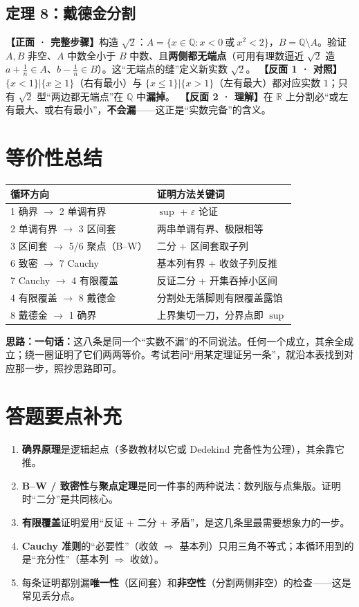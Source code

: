 \documentclass[11pt,a4paper,UTF8]{ctexart}
\newcommand{\R}{\mathbb R}
\newcommand{\eps}{\varepsilon}
\newcommand{\Q}{\mathbb Q}
\newcommand{\idea}[1]{\par\smallskip\noindent\colorbox{yellow!20}{\parbox{\dimexpr\linewidth-2\fboxsep}{\textbf{思路：}#1}}\par\smallskip}
\begin{document}
\subsection{定理 8：戴德金分割}

\noindent\textbf{【正面 · 完整步骤】}构造 $\sqrt2$：$A=\{x\in\Q:x<0\ \text{或}\ x^2<2\}$，$B=\Q\setminus A$。验证 $A,B$ 非空、$A$ 中数全小于 $B$ 中数、且\textbf{两侧都无端点}（可用有理数逼近 $\sqrt2$ 造 $a+\tfrac1n\in A$、$b-\tfrac1n\in B$）。这“无端点的缝”定义新实数 $\sqrt2$。
\textbf{【反面 1 · 对照】}$\{x<1\}|\{x\ge1\}$（右有最小）与 $\{x\le1\}|\{x>1\}$（左有最大）都对应实数 $1$；只有 $\sqrt2$ 型“两边都无端点”在 $\Q$ 中\textbf{漏掉}。\ \textbf{【反面 2 · 理解】}在 $\R$ 上分割必“或左有最大、或右有最小”，\textbf{不会漏}——这正是“实数完备”的含义。

\section{等价性总结}

\begin{center}
\begin{tabular}{ll}
循环方向 & 证明方法关键词\\\hline
1 确界 $\to$ 2 单调有界 & $\sup$ + $\eps$ 论证\\
2 单调有界 $\to$ 3 区间套 & 两串单调有界、极限相等\\
3 区间套 $\to$ 5/6 聚点（B–W） & 二分 + 区间套取子列\\
6 致密 $\to$ 7 Cauchy & 基本列有界 + 收敛子列反推\\
7 Cauchy $\to$ 4 有限覆盖 & 反证二分 + 开集吞掉小区间\\
4 有限覆盖 $\to$ 8 戴德金 & 分割处无落脚则有限覆盖露馅\\
8 戴德金 $\to$ 1 确界 & 上界集切一刀，分界点即 $\sup$\\
\end{tabular}
\end{center}

\idea{\textbf{一句话：}这八条是同一个“实数不漏”的不同说法。任何一个成立，其余全成立；绕一圈证明了它们两两等价。考试若问“用某定理证另一条”，就沿本表找到对应那一步，照抄思路即可。}

\section{答题要点补充}
\begin{enumerate}[leftmargin=1.4em]
\item \textbf{确界原理}是逻辑起点（多数教材以它或 Dedekind 完备性为公理），其余靠它推。
\item \textbf{B–W / 致密性}与\textbf{聚点定理}是同一件事的两种说法：数列版与点集版。证明时“二分”是共同核心。
\item \textbf{有限覆盖}证明爱用“反证 + 二分 + 矛盾”，是这几条里最需要想象力的一步。
\item \textbf{Cauchy 准则}的“必要性”（收敛 $\Rightarrow$ 基本列）只用三角不等式；本循环用到的是“充分性”（基本列 $\Rightarrow$ 收敛）。
\item 每条证明都别漏\textbf{唯一性}（区间套）和\textbf{非空性}（分割两侧非空）的检查——这是常见丢分点。
\end{enumerate}
\end{document}
